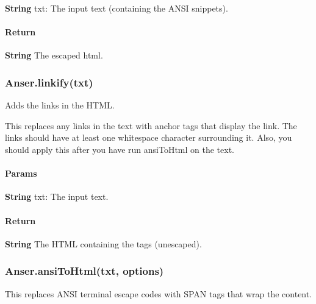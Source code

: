 \begin{DoxyItemize}
\item {\bfseries String} {\ttfamily txt}\+: The input text (containing the A\+N\+SI snippets).
\end{DoxyItemize}

\paragraph*{Return}


\begin{DoxyItemize}
\item {\bfseries String} The escaped html.
\end{DoxyItemize}

\subsubsection*{{\ttfamily Anser.\+linkify(txt)}}

Adds the links in the H\+T\+ML.

This replaces any links in the text with anchor tags that display the link. The links should have at least one whitespace character surrounding it. Also, you should apply this after you have run {\ttfamily ansi\+To\+Html} on the text. \paragraph*{Params}


\begin{DoxyItemize}
\item {\bfseries String} {\ttfamily txt}\+: The input text.
\end{DoxyItemize}

\paragraph*{Return}


\begin{DoxyItemize}
\item {\bfseries String} The H\+T\+ML containing the  tags (unescaped).
\end{DoxyItemize}

\subsubsection*{{\ttfamily Anser.\+ansi\+To\+Html(txt, options)}}

This replaces A\+N\+SI terminal escape codes with S\+P\+AN tags that wrap the content.

